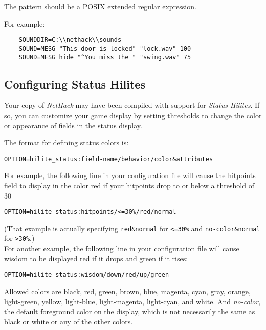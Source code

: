 The pattern should be a POSIX extended regular expression.

For example:

\begin{verbatim}
    SOUNDDIR=C:\\nethack\\sounds
    SOUND=MESG "This door is locked" "lock.wav" 100
    SOUND=MESG hide "^You miss the " "swing.wav" 75
\end{verbatim}

\subsection*{Configuring Status Hilites}

Your copy of {\it NetHack\/} may have been compiled with support
for {\it Status Hilites}.
If so, you can customize your game display by setting thresholds to
change the color or appearance of fields in the status display.

The format for defining status colors is:\\
\begin{verbatim}
OPTION=hilite_status:field-name/behavior/color&attributes
\end{verbatim}

For example, the following line in your configuration file will cause
the hitpoints field to display in the color red if your hitpoints
drop to or below a threshold of 30%
\begin{verbatim}
OPTION=hilite_status:hitpoints/<=30%/red/normal
\end{verbatim}
(That example is actually specifying {\tt red\&normal} for  {\tt <=30\%}
and {\tt no-color\&normal} for {\tt >30\%}.)\\

For another example, the following line in your configuration file will cause
wisdom to be displayed red if it drops and green if it rises:\\
\begin{verbatim}
OPTION=hilite_status:wisdom/down/red/up/green
\end{verbatim}

Allowed colors are black, red, green, brown, blue, magenta, cyan, gray,
orange, light-green, yellow, light-blue, light-magenta, light-cyan, and white.
And {\it no-color}, the default foreground color on the display, which
is not necessarily the same as black or white or any of the other colors.

